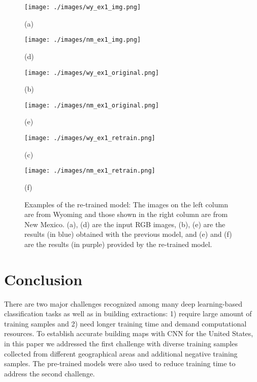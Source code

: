 \documentclass[journal]{IEEEtran}
\begin{document}
\begin{figure}[htb]
	
	\begin{minipage}[b]{0.49\linewidth}
		\centering
		\centerline{\texttt{[image: ./images/wy\_ex1\_img.png]}}
		\centerline{(a)}\medskip
	\end{minipage}
	\begin{minipage}[b]{0.49\linewidth}
		\centering
		\centerline{\texttt{[image: ./images/nm\_ex1\_img.png]}}
		\centerline{(d)}\medskip
	\end{minipage}
	\hfill
	\begin{minipage}[b]{0.49\linewidth}
		\centering
		\centerline{\texttt{[image: ./images/wy\_ex1\_original.png]}}
		\centerline{(b)}\medskip
	\end{minipage}
	\begin{minipage}[b]{0.49\linewidth}
		\centering
		\centerline{\texttt{[image: ./images/nm\_ex1\_original.png]}}
		\centerline{(e) }\medskip
	\end{minipage}
\begin{minipage}[b]{0.49\linewidth}
	\centering
	\centerline{\texttt{[image: ./images/wy\_ex1\_retrain.png]}}
	\centerline{(c) }\medskip
\end{minipage}
\begin{minipage}[b]{0.49\linewidth}
	\centering
	\centerline{\texttt{[image: ./images/nm\_ex1\_retrain.png]}}
	\centerline{(f)}\medskip
\end{minipage}
	\caption{\label{fig:wy_ex1_retrain}Examples of the re-trained model: The images on the left column are from Wyoming and those shown in the right column are from New Mexico. (a), (d) are the input RGB images, (b), (e) are the results (in blue) obtained with the previous model, and (e) and (f) are the results (in purple) provided by the re-trained model.}
	
	
\end{figure}






\section{Conclusion}
There are two major challenges recognized among many deep learning-based classification tasks as well as in building extractions: 1) require large amount of training samples and 2) need longer training time and demand computational resources. To establish accurate building maps with CNN for the United States, in this paper we addressed the first challenge with diverse training samples collected from different geographical areas and additional negative training samples. The pre-trained models were also used to reduce training time to address the second challenge. 
\end{document}
